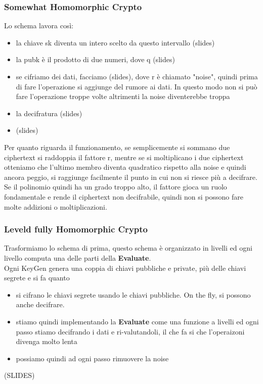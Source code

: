 \documentclass[12pt, oneside]{extbook} %
\begin{document}
\subsubsection{Somewhat Homomorphic Crypto}
Lo schema lavora così:
\begin{itemize}
	\item la chiave sk diventa un intero scelto da questo intervallo (slides)
	\item la pubk è il prodotto di due numeri, dove q (slides)
	\item se cifriamo dei dati, facciamo (slides), dove r è chiamato "noise", quindi prima di fare l'operazione si aggiunge del rumore ai dati. In questo modo non si può fare l'operazione troppe volte altrimenti la noise diventerebbe troppa
	\item la decifratura (slides)
	\item (slides)
\end{itemize}
Per quanto riguarda il funzionamento, se semplicemente si sommano due ciphertext si raddoppia il fattore r, mentre se si moltiplicano i due ciphertext otteniamo che l'ultimo membro diventa quadratico rispetto alla noise e quindi ancora peggio, si raggiunge facilmente il punto in cui non si riesce più a decifrare.\\Se il polinomio quindi ha un grado troppo alto, il fattore gioca un ruolo fondamentale e rende il ciphertext non decifrabile, quindi non si possono fare molte addizioni o moltiplicazioni.
\subsubsection{Leveld fully Homomorphic Crypto}
Trasformiamo lo schema di prima, questo schema è organizzato in livelli ed ogni livello computa una delle parti della \textbf{Evaluate}.\\Ogni KeyGen genera una coppia di chiavi pubbliche e private, più delle chiavi segrete e si fa quanto
\begin{itemize}
	\item si cifrano le chiavi segrete usando le chiavi pubbliche. On the fly, si possono anche decifrare. 
	\item stiamo quindi implementando la \textbf{Evaluate} come una funzione a livelli ed ogni passo stiamo decifrando i dati e ri-valutandoli, il che fa si che l'operaizoni divenga molto lenta
	\item possiamo quindi ad ogni passo rimuovere la noise
\end{itemize}
(SLIDES)
\end{document}
